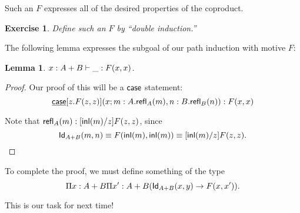 \documentclass[12pt]{article}
\newtheorem*{exercise}{Exercise}
\newtheorem*{lemma}{Lemma}
\begin{document}
Such an $F$ expresses all of the desired properties of the coproduct.

\begin{exercise}Define such an $F$ by ``double induction.''
 
\end{exercise}

The following lemma expresses the subgoal of our path induction with motive $F$:
\begin{lemma}
 $x:A+B\vdash \_: F(x,x)$.
\end{lemma}

\begin{proof}
 Our proof of this will be a $\operatorname{\textsf{case}}$ statement:
 $$\underline{\operatorname{\textsf{case}}}[z.F(z,z)](x; m:A.\mathsf{refl}_{A}(m),n:B.\mathsf{refl}_{B}(n)): F(x,x)$$
 
 Note that $\mathsf{refl}_{A}(m):[{\mathsf{inl}}(m)/z]F(z,z)$, since 
 $$\mathsf{Id}_{A+B}(m,n)\equiv F({\mathsf{inl}}(m),{\mathsf{inl}}(m))\equiv [{\mathsf{inl}}(m)/z]F(z,z).$$
\end{proof}

To complete the proof, we must define something of the type
$$\Pi x:A+B \Pi x': A+B(\mathsf{Id}_{A+B}(x,y)\to F(x,x')).$$

This is our task for next time!



\end{document}
